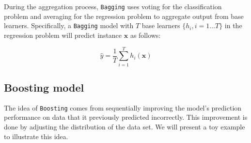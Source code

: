
During the aggregation process, \verb|Bagging| uses voting for the classification problem and averaging for the regression problem to aggregate output from base learners. Specifically, a \verb|Bagging| model with $T$ base learners $\{h_i, i=1\dots T\}$ in the regression problem will predict instance $\mathbf{x}$ as follows:

\begin{equation}
    \hat{y} = \frac{1}{T}\sum_{i=1}^T{h_i(\mathbf{x})}
\end{equation}

\subsection{Boosting model}


The idea of \verb|Boosting| comes from sequentially improving the model's prediction performance on data that it previously predicted incorrectly. This improvement is done by adjusting the distribution of the data set. We will present a toy example to illustrate this idea.


